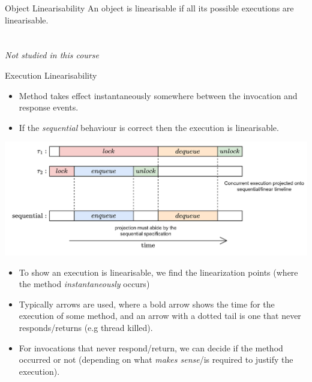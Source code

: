 \begin{tcbraster}[raster columns=2,raster equal height]
    \begin{definitionbox}{Object Linearisability}
        An object is linearisable if all its possible executions are linearisable.
        \\
        \\
        \\ \textit{Not studied in this course}  
    \end{definitionbox}
    \begin{definitionbox}{Execution Linearisability}
        \begin{itemize}
            \item Method takes effect instantaneously somewhere between the invocation and response events.
            \item If the \textit{sequential} behaviour is correct then the execution is linearisable.
        \end{itemize}
    \end{definitionbox}
\end{tcbraster}
\begin{center}
    \includegraphics[width=\textwidth]{concurrent_objects/images/sequential_projection.drawio.png}
\end{center}
\begin{itemize}
    \item To show an execution is linearisable, we find the linearization points (where the method \textit{instantaneously} occurs)
    \item Typically arrows are used, where a bold arrow shows the time for the execution of some method, and an arrow with a dotted tail is one that never responds/returns (e.g thread killed).
    \item For invocations that never respond/return, we can decide if the method occurred or not (depending on what \textit{makes sense}/is required to justify the execution).
\end{itemize}


